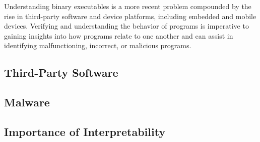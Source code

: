 Understanding binary executables is a more recent problem compounded by the rise in third-party software and device platforms, including embedded and mobile devices. Verifying and understanding the behavior of programs is imperative to gaining insights into how programs relate to one another and can assist in identifying malfunctioning, incorrect, or malicious programs.

\subsection{Third-Party Software}
	
	
\subsection{Malware}
	

\subsection{Importance of Interpretability}
	